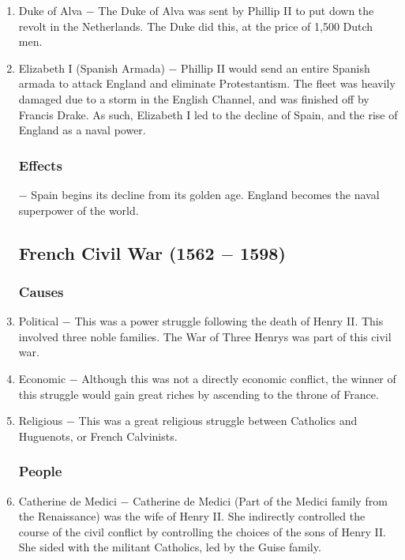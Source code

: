 \documentclass[12pt]{article}
\begin{document}
\begin{enumerate}
\item Duke of Alva $-$ The Duke of Alva was sent by Phillip II to put down the revolt in the Netherlands. The Duke did this, at the price of 1,500 Dutch men.

\item Elizabeth I (Spanish Armada) $-$ Phillip II would send an entire Spanish armada to attack England and eliminate Protestantism. The fleet was heavily damaged due to a storm in the English Channel, and was finished off by Francis Drake. As such, Elizabeth I led to the decline of Spain, and the rise of England as a naval power.

\subsubsection{Effects} $-$ Spain begins its decline from its golden age. England becomes the naval superpower of the world.

\subsection{French Civil War (1562 $-$ 1598)}

\subsubsection{Causes}

\item Political $-$ This was a power struggle following the death of Henry II. This involved three noble families. The War of Three Henrys was part of this civil war.

\item Economic $-$ Although this was not a directly economic conflict, the winner of this struggle would gain great riches by ascending to the throne of France. 

\item Religious $-$ This was a great religious struggle between Catholics and Huguenots, or French Calvinists.

\subsubsection{People}

\item Catherine de Medici $-$ Catherine de Medici (Part of the Medici family from the Renaissance) was the wife of Henry II. She indirectly controlled the course of the civil conflict by controlling the choices of the sons of Henry II. She sided with the militant Catholics, led by the Guise family.


\end{enumerate}
\end{document}
